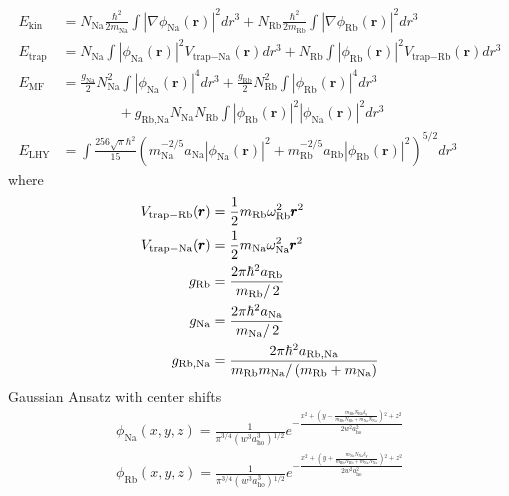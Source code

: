 \begin{equation}
\begin{split}
E_{\text{kin}}&=N_{\text{Na}}\frac{\hbar^2}{2m_{\text{Na}}}\int\left|\nabla\phi_{\text{Na}}(\pmb{r})\right|^2dr^3+N_{\text{Rb}}\frac{\hbar^2}{2m_{\text{Rb}}}\int\left|\nabla\phi_{\text{Rb}}(\pmb{r})\right|^2dr^3\\
E_{\text{trap}}&=N_{\text{Na}}\int\left|\phi_{\text{Na}}(\pmb{r})\right|^2V_{\text{trap}-\text{Na}}(\pmb{r})dr^3+N_{\text{Rb}}\int\left|\phi_{\text{Rb}}(\pmb{r})\right|^2V_{\text{trap}-\text{Rb}}(\pmb{r})dr^3\\
E_{\text{MF}}&=\frac{g_{\text{Na}}}{2}N_{\text{Na}}^2\int\left|\phi _{\text{Na}}(\pmb{r})\right|^4dr^3+\frac{g_{\text{Rb}}}{2}N_{\text{Rb}}^2\int\left|\phi_{\text{Rb}}(\pmb{r})\right|^4dr^3\\
&\qquad\qquad+g_{\text{Rb},\text{Na}}N_{\text{Na}}N_{\text{Rb}}\int\left|\phi_{\text{Rb}}(\pmb{r})\right|^2\left|\phi_{\text{Na}}(\pmb{r})\right|^2dr^3\\
E_{\text{LHY}}&=\int\frac{256\sqrt{\pi}\hbar^2}{15}\left(m_{\text{Na}}^{-2/5}a_{\text{Na}}\left|\phi_{\text{Na}}(\pmb{r})\right|^2+m_{\text{Rb}}^{-2/5}a_{\text{Rb}}\left|\phi_{\text{Rb}}(\pmb{r})\right|^2\right)^{5/2}dr^3
\end{split}
\end{equation}
where
\begin{equation}
\begin{split}
V_{\text{trap}-\text{Rb}}(\pmb{r})&=\frac{1}{2}m_{\text{Rb}}\omega _{\text{Rb}}^2\pmb{r}^2\\
V_{\text{trap}-\text{Na}}(\pmb{r})&=\frac{1}{2}m_{\text{Na}} \omega _{\text{Na}}^2\pmb{r}^2\\
g_{\text{Rb}}&=\frac{2\pi\hbar^2a_{\text{Rb}}}{\left.m_{\text{Rb}}\right/2}\\
g_{\text{Na}}&=\frac{2\pi\hbar^2a_{\text{Na}}}{\left.m_{\text{Na}}\right/2}\\
g_{\text{Rb},\text{Na}}&=\frac{2\pi\hbar^2a_{\text{Rb},\text{Na}}}{m_{\text{Rb}}m_{\text{Na}}/\left(m_{\text{Rb}}+m_{\text{Na}}\right)}
\end{split}
\end{equation}
Gaussian Ansatz with center shifts
\begin{equation}
\begin{split}
\phi _{\text{Na}}(x,y,z)=\frac{1}{\pi ^{3/4}\left(w^3a_{\text{ho}}^3\right){}^{1/2}}e^{-\frac{x^2+\left(y-\frac{m_{\text{Rb}}N_{\text{Rb}}\delta
_y}{m_{\text{Rb}}N_{\text{Rb}}+m_{\text{Na}}N_{\text{Na}}}\right){}^2+z^2}{2w^2a_{\text{ho}}^2}}\\
\phi _{\text{Rb}}(x,y,z)=\frac{1}{\pi ^{3/4}\left(w^3a_{\text{ho}}^3\right){}^{1/2}}e^{-\frac{x^2+\left(y+\frac{m_{\text{Na}}N_{\text{Na}}\delta
_y}{m_{\text{Rb}}N_{\text{Rb}}+m_{\text{Na}}N_{\text{Na}}}\right){}^2+z^2}{2w^2a_{\text{ho}}^2}}
\end{split}
\end{equation}
